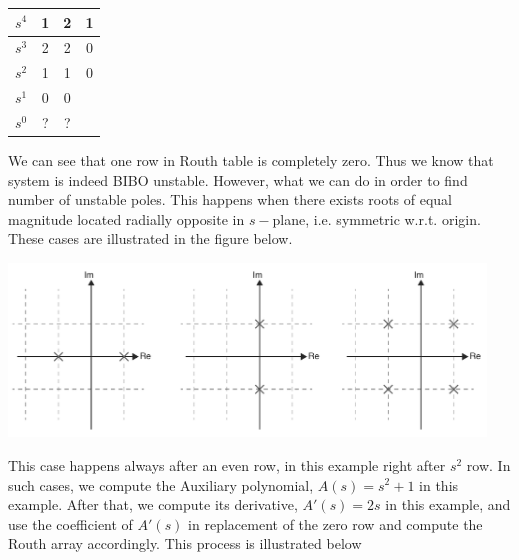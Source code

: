 \documentclass[twoside]{article}
\begin{document}
\begin{minipage}[h]{1\linewidth}
\begin{center}
\begin{tabular}{|c || c || c c |}
\hline
$s^4$ & 1 & 2 & 1 
\\ \hline
$s^3$ & 2 & 2 & 0
\\ \hline
$s^2$ & 1 & 1 & 0
\\ \hline
$s^1$ & 0 & 0 &
\\ \hline
$s^0$ & ? & ? & 
\\ \hline
\end{tabular}
\end{center}
\end{minipage}

We can see that one row in Routh table is completely zero. 
Thus we know that system is indeed BIBO unstable. However,
what we can do in order to find number of unstable poles. 
This happens when there exists roots of equal magnitude
located radially opposite in $s-$plane, i.e. symmetric
w.r.t. origin. These cases are illustrated in the figure below.

\vspace{6pt}

\begin{minipage}[h]{1\linewidth}
    \begin{center}
      \includegraphics[width=0.95\textwidth]{caseII}
    \end{center}
\end{minipage}

\vspace{6pt}

This case happens always after an even row, in this example right after $s^2$ row. In such 
cases, we compute the Auxiliary polynomial, $A(s) = s^2 + 1$ in this
example. After that, we compute its derivative, $A'(s) = 2 s$ in this example,
and use the coefficient of $A'(s)$ in replacement of the zero row and compute
the Routh array accordingly. This process is illustrated below
\end{document}

